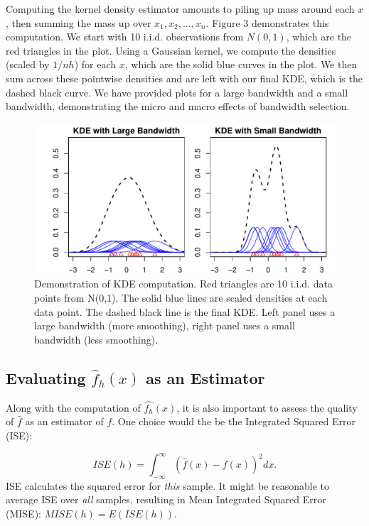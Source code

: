 \documentclass[]{article}
\begin{document}
Computing the kernel density estimator amounts to piling up mass around
each \(x\), then summing the mass up over \(x_1, x_2, \ldots, x_n\).
Figure 3 demonstrates this computation. We start with 10 i.i.d.
observations from \(N(0,1)\), which are the red triangles in the plot.
Using a Gaussian kernel, we compute the densities (scaled by \(1/nh\))
for each \(x\), which are the solid blue curves in the plot. We then sum
across these pointwise densities and are left with our final KDE, which
is the dashed black curve. We have provided plots for a large bandwidth
and a small bandwidth, demonstrating the micro and macro effects of
bandwidth selection.

\begin{figure}

{\centering \includegraphics{FinalReport_files/figure-latex/unnamed-chunk-4-1} 

}

\caption{Demonstration of KDE computation. Red triangles are 10 i.i.d. data points from N(0,1). The solid blue lines are scaled densities at each data point. The dashed black line is the final KDE. Left panel uses a large bandwidth (more smoothing), right panel uses a small bandwidth (less smoothing).}\label{fig:unnamed-chunk-4}
\end{figure}

\subsection{Evaluating $\widehat{f}_h(x)$ as an Estimator}

Along with the computation of \(\widehat{f_h}(x)\), it is also important
to assess the quality of \(\hat{f}\) as an estimator of \(f\). One
choice would the be the Integrated Squared Error (ISE):

\[ISE(h) = \int_{-\infty}^{\infty} \left(\hat{f}(x) - f(x)\right)^2dx.\]
ISE calculates the squared error for \emph{this} sample. It might be
reasonable to average ISE over \emph{all} samples, resulting in Mean
Integrated Squared Error (MISE): \(MISE(h) = E\left(ISE(h)\right).\)
\end{document}
